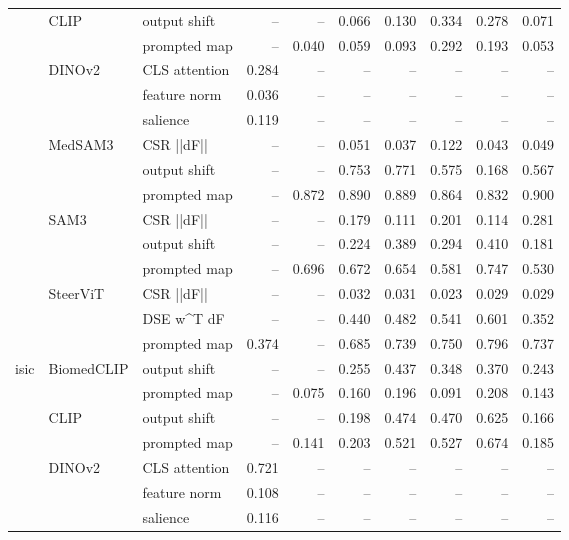 \begin{tabular}{lllrrrrrrr}
\cline{2-10}
 & \multirow[t]{2}{*}{CLIP} & output shift & -- & -- & 0.066 & 0.130 & 0.334 & 0.278 & 0.071 \\
 &  & prompted map & -- & 0.040 & 0.059 & 0.093 & 0.292 & 0.193 & 0.053 \\
\cline{2-10}
 & \multirow[t]{3}{*}{DINOv2} & CLS attention & 0.284 & -- & -- & -- & -- & -- & -- \\
 &  & feature norm & 0.036 & -- & -- & -- & -- & -- & -- \\
 &  & salience & 0.119 & -- & -- & -- & -- & -- & -- \\
\cline{2-10}
 & \multirow[t]{3}{*}{MedSAM3} & CSR  ||dF|| & -- & -- & 0.051 & 0.037 & 0.122 & 0.043 & 0.049 \\
 &  & output shift & -- & -- & 0.753 & 0.771 & 0.575 & 0.168 & 0.567 \\
 &  & prompted map & -- & 0.872 & 0.890 & 0.889 & 0.864 & 0.832 & 0.900 \\
\cline{2-10}
 & \multirow[t]{3}{*}{SAM3} & CSR  ||dF|| & -- & -- & 0.179 & 0.111 & 0.201 & 0.114 & 0.281 \\
 &  & output shift & -- & -- & 0.224 & 0.389 & 0.294 & 0.410 & 0.181 \\
 &  & prompted map & -- & 0.696 & 0.672 & 0.654 & 0.581 & 0.747 & 0.530 \\
\cline{2-10}
 & \multirow[t]{3}{*}{SteerViT} & CSR  ||dF|| & -- & -- & 0.032 & 0.031 & 0.023 & 0.029 & 0.029 \\
 &  & DSE  w^T dF & -- & -- & 0.440 & 0.482 & 0.541 & 0.601 & 0.352 \\
 &  & prompted map & 0.374 & -- & 0.685 & 0.739 & 0.750 & 0.796 & 0.737 \\
\cline{1-10} \cline{2-10}
\multirow[t]{16}{*}{isic} & \multirow[t]{2}{*}{BiomedCLIP} & output shift & -- & -- & 0.255 & 0.437 & 0.348 & 0.370 & 0.243 \\
 &  & prompted map & -- & 0.075 & 0.160 & 0.196 & 0.091 & 0.208 & 0.143 \\
\cline{2-10}
 & \multirow[t]{2}{*}{CLIP} & output shift & -- & -- & 0.198 & 0.474 & 0.470 & 0.625 & 0.166 \\
 &  & prompted map & -- & 0.141 & 0.203 & 0.521 & 0.527 & 0.674 & 0.185 \\
\cline{2-10}
 & \multirow[t]{3}{*}{DINOv2} & CLS attention & 0.721 & -- & -- & -- & -- & -- & -- \\
 &  & feature norm & 0.108 & -- & -- & -- & -- & -- & -- \\
 &  & salience & 0.116 & -- & -- & -- & -- & -- & -- \\

\end{tabular}
